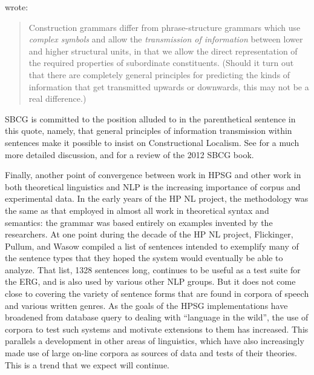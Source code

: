 \documentclass[output=paper,biblatex,babelshorthands,newtxmath,draftmode,colorlinks,citecolor=brown]{langscibook}
\begin{document}
\citet[]{Fillmore88a} wrote:
\begin{quote}
Construction grammars differ from phrase-structure grammars which use \emph{complex symbols} and
allow the \emph{transmission of information} between lower and higher structural units, in that we
allow the direct representation of the required properties of subordinate constituents.  (Should it
turn out that there are completely general principles for predicting the kinds of information that
get transmitted upwards or downwards, this may not be a real difference.) \hfill\citep[]{Fillmore88a}
\end{quote}
SBCG is committed to the position alluded to in the parenthetical sentence in this quote, namely, that general principles of information transmission within sentences make it possible to insist on Constructional Localism.   See  for a much more detailed discussion, and \citet{VanEynde2015a} for a review of the 2012 SBCG book.\label{page-sbcg-end}\indexsbcgend  

Finally, another point of convergence between work in HPSG and other work in both theoretical
linguistics and NLP is the increasing importance of corpus and experimental data. In the early years
of the HP NL project, the methodology was the same as that employed in almost all work in
theoretical syntax and semantics: the grammar was based entirely on examples invented by the
researchers.  At one point during the decade of the HP NL project, Flickinger, Pullum, and Wasow
compiled a list of sentences intended to exemplify many of the sentence types that they hoped the
system would eventually be able to analyze.  That list, 1328 sentences long, continues to be useful
as a test suite for the ERG, and is also used by various other NLP groups.  But it does not come
close to covering the variety of sentence forms that are found in corpora of speech and various
written genres.  As the goals of the HPSG implementations have broadened from database query to
dealing with ``language in the wild'', the use of corpora to test such systems and motivate
extensions to them has increased.  This parallels a development in other areas of linguistics, which
have also increasingly made use of large on-line corpora as sources of data and tests of their
theories.  This is a trend that we expect will continue.
\end{document}
